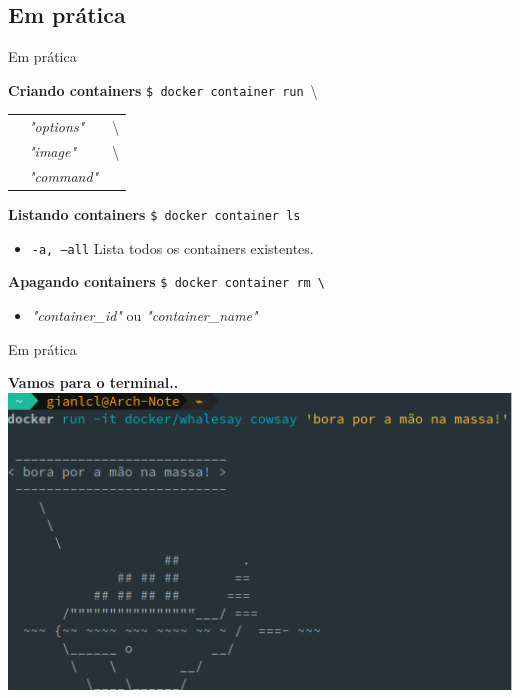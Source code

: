 \documentclass[10pt]{beamer}
\begin{document}
\subsection{Em prática}
\begin{frame}{Em prática}{}
    \begin{block}{\textbf{Criando containers}}
        {\large \texttt{\$ docker container run}\ \textbackslash}\\
        \begin{tabular}{cll}
            & \textit{"options"} & \textbackslash \\
            & \textit{"image"} & \textbackslash \\
            & \textit{"command"} & 
        \end{tabular}
    \end{block}
    \pause
    \begin{block}{\textbf{Listando containers}}
        {\large \texttt{\$ docker container ls}}
        \begin{itemize}
            \item[] \texttt{-a, ---all} 
                \hspace{1cm} Lista todos os containers existentes.
        \end{itemize}
    \end{block}
    \pause
    \begin{block}{\textbf{Apagando containers}}
        {\large \texttt{\$ docker container rm\ \textbackslash}}
        \begin{itemize}
            \item[] \textit{"container\_id"} ou \textit{"container\_name"}
        \end{itemize}
    \end{block}
\end{frame}
\begin{frame}{Em prática}{}
    \begin{block}{\textbf{Vamos para o terminal..}}
        \centering
        \vspace{0.3cm}
        \includegraphics[width=0.8\linewidth]{AAUgraphics/whalesay1.png}
    \end{block}
\end{frame}
\end{document}
